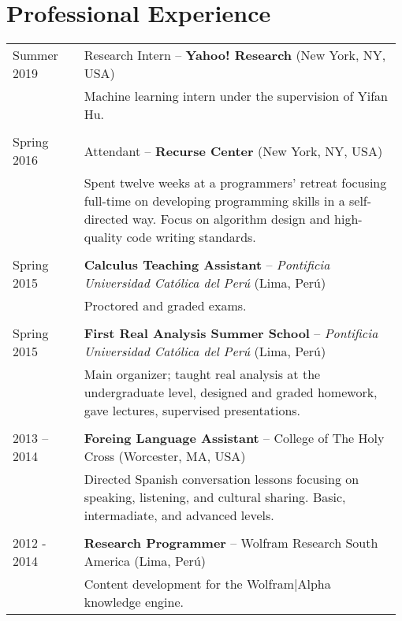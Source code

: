\documentclass[12pt,]{scrartcl}
\begin{document}
\section{Professional Experience}\label{experience}
\begin{table}[h]
{\def\arraystretch{1}\tabcolsep=0pt
\begin{tabular}{p{0.18\linewidth}p{0.8\linewidth}}

Summer 2019 &
Research Intern -- \textbf{Yahoo! Research} (New York, NY, USA) \\
& Machine learning intern under the supervision of Yifan Hu. \\ \\

Spring 2016 &
Attendant -- \textbf{Recurse Center} (New York, NY, USA) \\
& Spent twelve weeks at a programmers' retreat focusing full-time on developing programming skills in a self-directed way. Focus on algorithm design and high-quality code writing standards. \\ \\

Spring 2015 &
\textbf{Calculus Teaching Assistant} -- \textit{Pontificia Universidad Católica del Perú} (Lima, Perú) \\
& Proctored and graded exams. \\ \\

Spring 2015 &
\textbf{First Real Analysis Summer School} -- \textit{Pontificia Universidad Católica del Perú} (Lima, Perú) \\
& Main organizer; taught real analysis at the undergraduate level, designed and graded homework, gave lectures, supervised presentations. \\ \\

2013 -- 2014 &
\textbf{Foreing Language Assistant} -- College of The Holy Cross (Worcester, MA, USA) \\
& Directed Spanish conversation lessons focusing on speaking, listening, and cultural sharing. Basic, intermadiate, and advanced levels. \\ \\

2012 - 2014 &
\textbf{Research Programmer} -- Wolfram Research South America (Lima, Perú) \\
& Content development for the Wolfram|Alpha knowledge engine. \\

\end{tabular}}
\end{table}
\end{document}
